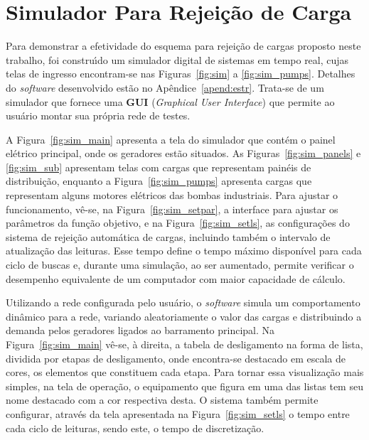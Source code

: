 \chapter{Simulador Para Rejei{\c c}{\~a}o de Carga} \label{cap:impl}

Para demonstrar  a efetividade do esquema para rejei{\c c}{\~a}o de cargas proposto neste trabalho, foi constru{\'\i}do um simulador digital de sistemas em tempo real, cujas telas de ingresso encontram-se nas Figuras~\ref{fig:sim} a \ref{fig:sim_pumps}. Detalhes do \textit{software} desenvolvido est{\~a}o no Ap{\^e}ndice~\ref{apend:estr}. Trata-se de um simulador que fornece uma \textbf{GUI} (\textit{Graphical User Interface}) que permite ao usu{\'a}rio montar sua pr{\'o}pria rede de testes.

A Figura~\ref{fig:sim_main} apresenta a tela do simulador que cont{\'e}m o painel el{\'e}trico principal, onde os geradores est{\~a}o situados. As Figuras~\ref{fig:sim_panels} e \ref{fig:sim_sub} apresentam telas com cargas que representam pain{\'e}is de distribui{\c c}{\~a}o, enquanto a Figura~\ref{fig:sim_pumps} apresenta cargas que representam alguns motores el{\'e}tricos das bombas industriais. Para ajustar o funcionamento, v{\^e}-se, na Figura~\ref{fig:sim_setpar}, a interface para ajustar os par{\^a}metros da fun{\c c}{\~a}o objetivo, e na Figura~\ref{fig:sim_setls}, as configura{\c c}{\~o}es do sistema de rejei{\c c}{\~a}o autom{\'a}tica de cargas, incluindo tamb{\'e}m o intervalo de atualiza{\c c}{\~a}o das leituras. Esse tempo define o tempo m{\'a}ximo dispon{\'i}vel para cada ciclo de buscas e, durante uma simula{\c c}{\~a}o, ao ser aumentado, permite verificar o desempenho equivalente de um computador com maior capacidade de c{\'a}lculo.

Utilizando a rede configurada pelo usu{\'a}rio, o \textit{software} simula um comportamento din{\^a}mico para a rede, variando aleatoriamente o valor das cargas e distribuindo a demanda pelos geradores ligados ao barramento principal. Na Figura~\ref{fig:sim_main} v{\^e}-se, {\`a} direita, a tabela de desligamento na forma de lista, dividida por etapas de desligamento, onde encontra-se destacado em escala de cores, os elementos que constituem cada etapa. Para tornar essa visualiza{\c c}{\~a}o mais simples, na tela de opera{\c c}{\~a}o, o equipamento que figura em uma das listas tem seu nome destacado com a cor respectiva desta. O sistema tamb{\'e}m permite configurar, atrav{\'e}s da tela apresentada na Figura~\ref{fig:sim_setls} o tempo entre cada ciclo de leituras, sendo este, o tempo de discretiza{\c c}{\~a}o.

